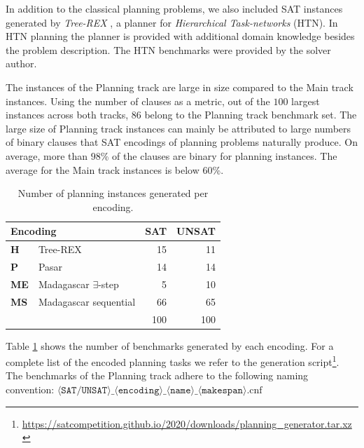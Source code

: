 \documentclass{elsarticle}
\begin{document}
In addition to the classical planning problems, we also included SAT instances
generated by \emph{Tree-REX} \cite{TreeRex19}, a planner for \emph{Hierarchical
	Task-networks} (HTN). In HTN planning the planner is provided with additional domain
knowledge besides the problem description. The HTN benchmarks were provided by
the solver author.

The instances of the Planning track are large in size compared to the Main track
instances. Using the number of clauses as a metric, out of the $100$ largest
instances across both tracks,
$86$ belong to the Planning track benchmark set. The large size of Planning track instances
can mainly be attributed to large numbers of
binary clauses that SAT encodings of planning problems naturally produce. 
On average, more than $98$\% of the clauses are binary for
planning instances. The average for the Main track instances is below $60$\%.

\begin{table}[t]
	\centering\small
	\begin{tabular}{llrr}
		\multicolumn{2}{l}{Encoding} & SAT                       & UNSAT       \\
		\hline\arrayrulecolor{lightgray}
		\textbf{H}                   & Tree-REX                  & 15    & 11  \\
		\textbf{P}                   & Pasar                     & 14    & 14  \\
		\textbf{ME}                  & Madagascar $\exists$-step & 5     & 10  \\
		\textbf{MS}                  & Madagascar sequential     & 66    & 65  \\
		\hline
		                             &                           & 100   & 100 \\
	\end{tabular}
	\label{tab:planningBenchmarkDist}
	\caption{Number of planning instances generated per encoding.}
\end{table}

Table \ref{tab:planningBenchmarkDist} shows the number of benchmarks generated
by each encoding.
For a complete list of the encoded planning tasks we refer to the
generation script\footnote{\url{https://satcompetition.github.io/2020/downloads/planning_generator.tar.xz}}.
The benchmarks of the Planning track adhere to the following naming convention:
${\langle \texttt{SAT/UNSAT} \rangle\_\langle \texttt{encoding} \rangle\_\langle
			\texttt{name} \rangle\_\langle \texttt{makespan}
			\rangle\text{.cnf}}$
\end{document}
